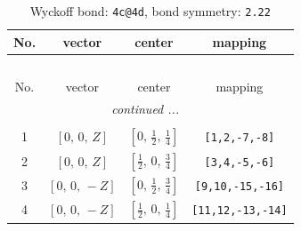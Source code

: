 \documentclass[fleqn,8pt]{jsarticle}
\begin{document}
\renewcommand{\arraystretch}{1.2}
\begin{longtable}{cccc}
\caption{Wyckoff bond: {\tt 4c@4d}, bond symmetry: {\tt 2.22}}
 \\
 \hline \hline
No. & vector & center & mapping \\ \hline \endfirsthead

\multicolumn{3}{l}{\tablename\ \thetable{}} \\
 \hline \hline
No. & vector & center & mapping \\ \hline \endhead

 \hline \hline
\multicolumn{3}{r}{\footnotesize\it continued ...} \\ \endfoot

 \hline \hline
\multicolumn{3}{r}{} \\ \endlastfoot

1 & $\left[ 0,\, 0,\, Z \right]$ & $\left[ 0,\, \frac{1}{2},\, \frac{1}{4} \right]$ & {\tt [1,2,-7,-8]} \\ \hline
2 & $\left[ 0,\, 0,\, Z \right]$ & $\left[ \frac{1}{2},\, 0,\, \frac{3}{4} \right]$ & {\tt [3,4,-5,-6]} \\ \hline
3 & $\left[ 0,\, 0,\, - Z \right]$ & $\left[ 0,\, \frac{1}{2},\, \frac{3}{4} \right]$ & {\tt [9,10,-15,-16]} \\ \hline
4 & $\left[ 0,\, 0,\, - Z \right]$ & $\left[ \frac{1}{2},\, 0,\, \frac{1}{4} \right]$ & {\tt [11,12,-13,-14]} \\
\end{longtable}
\renewcommand{\arraystretch}{1.2}
\end{document}

